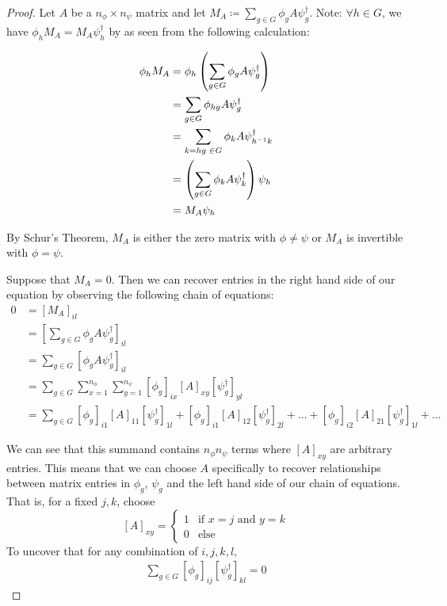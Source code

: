 \begin{proof} Let $A$ be a $n_\phi \times n_\psi$ matrix and let $M_A \coloneq \sum_{g\in G} \phi_{g} A \psi_g^{\dag}$. Note: $\forall h \in G$, we have $\phi_h M_A  = M_A \psi_h^\dag$ by as seen from the following calculation:

\begin{equation}
	\begin{aligned}
		\phi_h M_A &=  \phi_h \left(\sum_{g\in G} \phi_{g} A \psi_g^{\dag}\right) \\
				&= \sum_{g\in G} \phi_{hg} A \psi_g^{\dag} \\
				&= \sum_{k = hg \hspace{1mm} \in G} \phi_k A \psi_{h^{-1}k}^{\dag}\\
				 &= \left(\sum_{g\in G} \phi_{k} A \psi_k^{\dag} \right)\psi_h \\
				 &= M_A\psi_h 
	\end{aligned}
\end{equation}

By Schur's Theorem, $M_A$ is either the zero matrix with $\phi \neq \psi$ or $M_A$ is invertible with $\phi=\psi$. 

Suppose that $M_A = 0$. Then we can recover entries in the right hand side of our equation by observing the following chain of equations:
\begin{equation}
	\begin{aligned}
		    0 &= \left[M_A\right]_{il} \\ 
			&= \left[\sum_{g\in G} \phi_{g} A \psi_g^{\dag}\right]_{il} \\
			&= \sum_{g\in G} \left[\phi_{g} A \psi_g^{\dag}\right]_{il} \\
			&= \sum_{g\in G} \sum_{x=1}^{n_\phi} \sum_{y=1}^{n_\psi}\left[\phi_{g}\right]_{ix} \left[A\right]_{xy} \left[\psi_g^{\dag}\right]_{yl} \\
			&= \sum_{g\in G} \left[\phi_{g}\right]_{i1} \left[A\right]_{11} \left[\psi_g^{\dag}\right]_{1l} + \left[\phi_{g}\right]_{i1} \left[A\right]_{12} \left[\psi_g^{\dag}\right]_{2l} + \hdots + \left[\phi_{g}\right]_{i2} \left[A\right]_{21} \left[\psi_g^{\dag}\right]_{1l} + \hdots
	\end{aligned}
\end{equation}

We can see that this summand contains $n_\phi n_\psi$ terms where $[A]_{xy}$ are arbitrary entries. This means that we can choose $A$ specifically to recover relationships between matrix entries in $\phi_g$, $\psi_g$ and the left hand side of our chain of equations. That is, for a fixed $j,k$, choose $$[A]_{xy} = \begin{cases}
												1 & \text{if }x=j\text{ and } y=k \\
												0 & \text{else}
\end{cases}$$
To uncover that for any combination of $i,j,k,l,$
\begin{equation}
	\begin{aligned}
		\sum_{g\in G} \left[\phi_g\right]_{ij}\left[\psi^\dag_g\right]_{kl} = 0
	\end{aligned}
\end{equation}


\end{proof}
